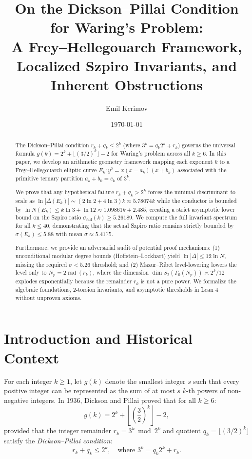 \documentclass[11pt,reqno]{amsart}
\title[The Frey--Hellegouarch Framework for Dickson--Pillai]{On the Dickson--Pillai Condition for Waring's Problem:\\A Frey--Hellegouarch Framework, Localized Szpiro Invariants, and Inherent Obstructions}
\author{Emil Kerimov}
\date{\today}
\theoremstyle{definition}
\numberwithin{equation}{section}
\begin{document}
\maketitle

\begin{abstract}
The Dickson--Pillai condition $r_k + q_k \le 2^k$ (where $3^k = q_k 2^k + r_k$) governs the universal formula $g(k) = 2^k + \lfloor(3/2)^k\rfloor - 2$ for Waring's problem across all $k \ge 6$. In this paper, we develop an arithmetic geometry framework mapping each exponent $k$ to a Frey--Hellegouarch elliptic curve $E_k : y^2 = x(x - a_k)(x + b_k)$ associated with the primitive ternary partition $a_k + b_k = c_k$ of $3^k$.

We prove that any hypothetical failure $r_k + q_k > 2^k$ forces the minimal discriminant to scale as $\ln |\Delta(E_k)| \sim (2\ln 2 + 4\ln 3)k \approx 5.78074 k$ while the conductor is bounded by $\ln N(E_k) \le k \ln 3 + \ln 12 \approx 1.09861 k + 2.485$, creating a strict asymptotic lower bound on the Szpiro ratio $\sigma_{\mathrm{fail}}(k) \ge 5.26189$. We compute the full invariant spectrum for all $k \le 40$, demonstrating that the actual Szpiro ratio remains strictly bounded by $\sigma(E_k) \le 5.88$ with mean $\bar{\sigma} \approx 5.4175$.

Furthermore, we provide an adversarial audit of potential proof mechanisms:
(1) unconditional modular degree bounds (Hoffstein--Lockhart) yield $\ln |\Delta| \le 12 \ln N$, missing the required $\sigma < 5.26$ threshold; and
(2) Mazur--Ribet level-lowering lowers the level only to $N_p = 2 \operatorname{rad}(r_k)$, where the dimension $\dim S_2(\Gamma_0(N_p)) \asymp 2^k / 12$ explodes exponentially because the remainder $r_k$ is not a pure power. We formalize the algebraic foundations, 2-torsion invariants, and asymptotic thresholds in Lean 4 without unproven axioms.
\end{abstract}

\section{Introduction and Historical Context}

For each integer $k \ge 1$, let $g(k)$ denote the smallest integer $s$ such that every positive integer can be represented as the sum of at most $s$ $k$-th powers of non-negative integers. In 1936, Dickson \cite{dickson1936} and Pillai \cite{pillai1936} proved that for all $k \ge 6$:
\begin{equation}\label{eq:waring_formula}
g(k) = 2^k + \left\lfloor \left(\frac{3}{2}\right)^k \right\rfloor - 2,
\end{equation}
provided that the integer remainder $r_k = 3^k \bmod 2^k$ and quotient $q_k = \lfloor (3/2)^k \rfloor$ satisfy the \emph{Dickson--Pillai condition}:
\begin{equation}\label{eq:dickson_pillai}
r_k + q_k \le 2^k, \quad \text{where } 3^k = q_k 2^k + r_k.
\end{equation}
\end{document}
